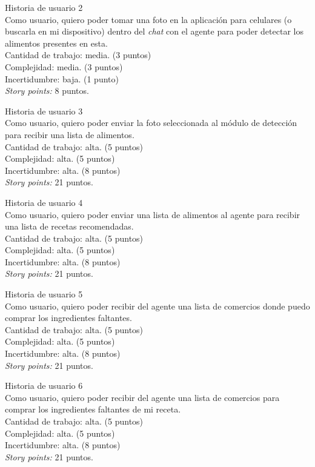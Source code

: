 \documentclass[
11pt, %
]{charter}
\begin{document}
Historia de usuario 2 \\
Como usuario, quiero poder tomar una foto en la aplicación para celulares (o buscarla en mi dispositivo) dentro del \textit{chat} con el agente para poder detectar los alimentos presentes en esta.\\
Cantidad de trabajo: media. (3 puntos)\\
Complejidad: media. (3 puntos)\\
Incertidumbre: baja. (1 punto)\\
\textit{Story points:} 8 puntos.

Historia de usuario 3 \\
Como usuario, quiero poder enviar la foto seleccionada al módulo de detección para recibir una lista de alimentos. \\
Cantidad de trabajo: alta. (5 puntos)\\
Complejidad: alta. (5 puntos)\\
Incertidumbre: alta. (8 puntos)\\
\textit{Story points:} 21 puntos.

Historia de usuario 4 \\
Como usuario, quiero poder enviar una lista de alimentos al agente para recibir una lista de recetas recomendadas. \\
Cantidad de trabajo: alta. (5 puntos)\\
Complejidad: alta. (5 puntos)\\
Incertidumbre: alta. (8 puntos)\\
\textit{Story points:} 21 puntos.

Historia de usuario 5 \\
Como usuario, quiero poder recibir del agente una lista de comercios donde puedo comprar los ingredientes faltantes. \\
Cantidad de trabajo: alta. (5 puntos)\\
Complejidad: alta. (5 puntos)\\
Incertidumbre: alta. (8 puntos)\\
\textit{Story points:} 21 puntos.

Historia de usuario 6 \\
Como usuario, quiero poder recibir del agente una lista de comercios para comprar los ingredientes faltantes de mi receta. \\
Cantidad de trabajo: alta. (5 puntos)\\
Complejidad: alta. (5 puntos)\\
Incertidumbre: alta. (8 puntos)\\
\textit{Story points:} 21 puntos.
\end{document}
